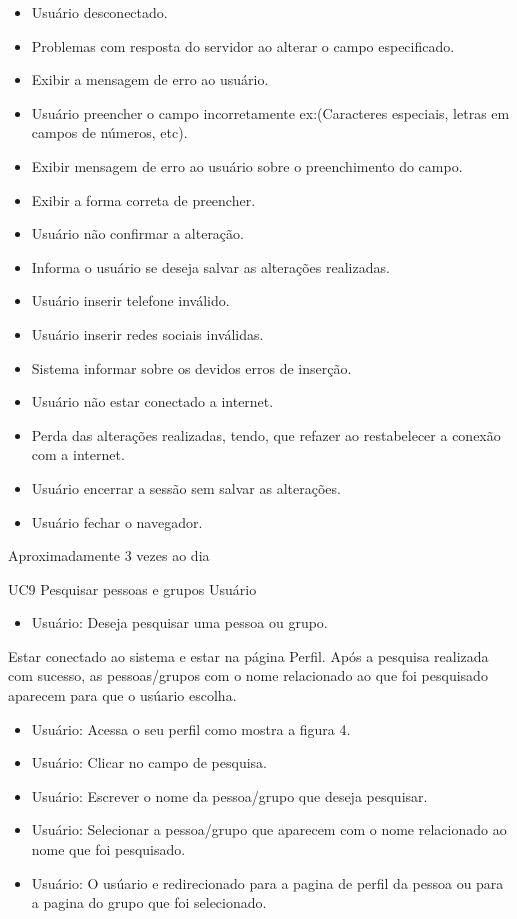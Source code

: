 {
\begin{itemize}
	\item Usuário desconectado.
	\item Problemas com resposta do servidor ao alterar o campo especificado.
	\item Exibir a mensagem de erro ao usuário.
	\item Usuário preencher o campo incorretamente ex:(Caracteres especiais, letras em campos de números, etc).
	\item Exibir mensagem de erro ao usuário sobre o preenchimento do campo.
	\item Exibir a forma correta de preencher.
	\item Usuário não confirmar a alteração.
	\item Informa o usuário se deseja salvar as alterações realizadas.
	\item Usuário inserir telefone inválido.
	\item Usuário inserir redes sociais inválidas.
	\item Sistema informar sobre os devidos erros de inserção.
	\item Usuário não estar conectado a internet.
	\item Perda das alterações realizadas, tendo, que refazer ao restabelecer a conexão com a internet.
	\item Usuário encerrar a sessão sem salvar as alterações.
	\item Usuário fechar o navegador.
\end{itemize}
}
{Aproximadamente 3 vezes ao dia}
{

}
\casoDeUso
{UC9}
{Pesquisar pessoas e grupos}
{Usuário}
{
\begin{itemize}
	\item Usuário: Deseja pesquisar uma pessoa ou grupo.	
\end{itemize}
}
{Estar conectado ao sistema e estar na página Perfil.}
{Após a pesquisa realizada com sucesso, as pessoas/grupos com o nome relacionado ao que foi pesquisado aparecem para que o usúario escolha.}
{
\begin{itemize}
	\item Usuário: Acessa o seu perfil como mostra a figura 4.
	\item Usuário: Clicar no campo de pesquisa.
	\item Usuário: Escrever o nome da pessoa/grupo que deseja pesquisar.
	\item Usuário: Selecionar a pessoa/grupo que aparecem com o nome relacionado ao nome que foi pesquisado.
	\item Usuário: O usúario e redirecionado para a pagina de perfil da pessoa ou para a pagina do grupo que foi selecionado.
\end{itemize}
}
